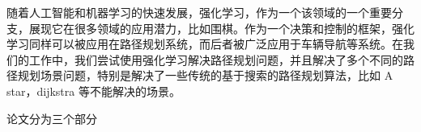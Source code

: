 \documentclass{standalone}
\begin{document}
	
\begin{chineseabstract}
随着人工智能和机器学习的快速发展，强化学习，作为一个该领域的一个重要分支，展现它在很多领域的应用潜力，比如围棋。作为一个决策和控制的框架，强化学习同样可以被应用在路径规划系统，而后者被广泛应用于车辆导航等系统。在我们的工作中，我们尝试使用强化学习解决路径规划问题，并且解决了多个不同的路径规划场景问题，特别是解决了一些传统的基于搜索的路径规划算法，比如 A star，dijkstra 等不能解决的场景。

论文分为三个部分

\end{chineseabstract}
\end{document}
